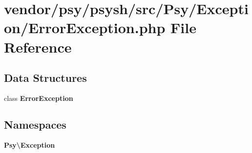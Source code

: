 \section{vendor/psy/psysh/src/\+Psy/\+Exception/\+Error\+Exception.php File Reference}
\label{psy_2psysh_2src_2_psy_2_exception_2_error_exception_8php}
\subsection*{Data Structures}
\begin{DoxyCompactItemize}
\item 
class {\bf Error\+Exception}
\end{DoxyCompactItemize}
\subsection*{Namespaces}
\begin{DoxyCompactItemize}
\item 
 {\bf Psy\textbackslash{}\+Exception}
\end{DoxyCompactItemize}
